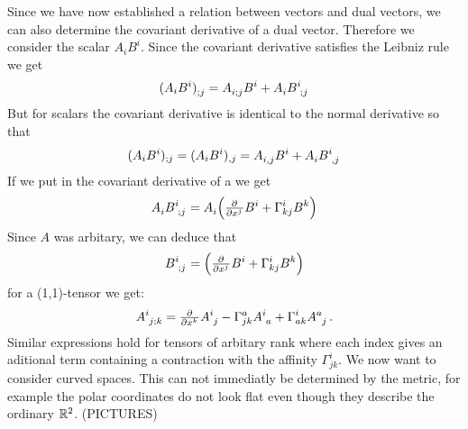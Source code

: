 Since we have now established a relation between vectors and dual vectors, we
can also determine the covariant derivative of a dual vector. Therefore we
consider the scalar $A_iB^i$. Since the covariant derivative satisfies the
Leibniz rule we get
\begin{align}
\tensor{(A_iB^i)}{_{;j}} =
\tensor{A}{_i_;_j}\tensor{B}{^i}+\tensor{A}{_i}\tensor{B}{^i_;_j}
\end{align}
But for scalars the covariant derivative is identical to the normal derivative
so that 
\begin{align}
(A_iB^i)_{;j} =(A_iB^i)_{,j}=
\tensor{A}{_i_,_j}\tensor{B}{^i}+\tensor{A}{_i}\tensor{B}{^i_,_j}
\end{align}
If we put in the covariant derivative of a we get 
\begin{equation}
\tensor{A}{_i}\tensor{B}{^i_;_j}=\tensor{A}{_i}\left(\pd{}{{x^j}}B^i+\Gamma^i_{kj}\tensor{B}{^k}\right)
\end{equation}
Since $A$ was arbitary, we can deduce that
\begin{equation}
\tensor{B}{^i_;_j}=\left(\pd{}{{x^j}}B^i+\Gamma^i_{kj}\tensor{B}{^k}\right)
\end{equation}
for a (1,1)-tensor we get:
\begin{equation}
\tensor{A}{^i_j_;_k}=\pd{}{{x^k}}\tensor{A}{^i_j}-\Gamma^a_{jk}\tensor{A}{^i_a}+\Gamma^i_{ak}\tensor{A}{^a_j}\,
.\end{equation}
Similar expressions hold for tensors of arbitary rank where each index gives an
aditional term containing a contraction with the affinity $\Gamma^i_{jk}$. 
We now want to consider curved spaces. This can not immediatly be determined by
the metric, for example the polar coordinates do not look flat even though they
describe the ordinary $\mathbb{R}^2$. (PICTURES)
